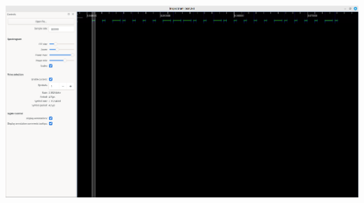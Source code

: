 \documentclass{beamer}
\begin{document}
\begin{frame}
\includegraphics[width=\textwidth]{../Pics/screenshots/inspectrum_full_message.png}
\end{frame}
\end{document}
